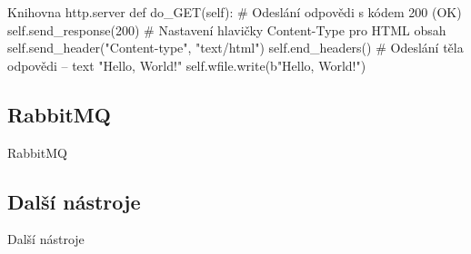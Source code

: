 \documentclass{beamer}
\begin{document}
\begin{frame}{Knihovna http.server}
	def do_GET(self):
		# Odeslání odpovědi s kódem 200 (OK)
		self.send_response(200)
		# Nastavení hlavičky Content-Type pro HTML obsah
		self.send_header("Content-type", "text/html") 
		self.end_headers()
		# Odeslání těla odpovědi – text "Hello, World!"     
		self.wfile.write(b"Hello, World!") 
\end{frame}

\subsection{RabbitMQ}
\begin{frame}{RabbitMQ}

\end{frame}

\subsection{Další nástroje}
\begin{frame}{Další nástroje}

\end{frame}
\end{document}
